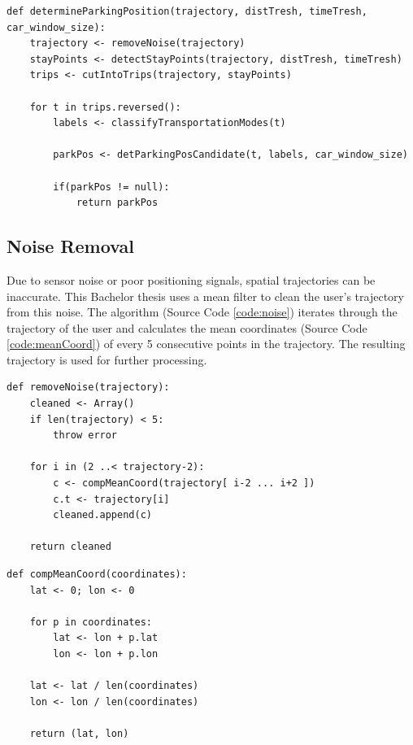 \begin{lstlisting}[style=py, caption={Pseudocode: Determine Parking Position Candidate}, label={code:DetParkPos}]
def determineParkingPosition(trajectory, distTresh, timeTresh, car_window_size):
    trajectory <- removeNoise(trajectory)
    stayPoints <- detectStayPoints(trajectory, distTresh, timeTresh)
    trips <- cutIntoTrips(trajectory, stayPoints)
    
    for t in trips.reversed():
        labels <- classifyTransportationModes(t)
        
        parkPos <- detParkingPosCandidate(t, labels, car_window_size)
        
        if(parkPos != null):
            return parkPos
\end{lstlisting}



\subsection{Noise Removal}

Due to sensor noise or poor positioning signals, spatial trajectories can be inaccurate. This Bachelor thesis uses a mean filter to clean the user's trajectory from this noise. The algorithm (Source Code \ref{code:noise}) iterates through the trajectory of the user and calculates the mean coordinates (Source Code \ref{code:meanCoord}) of every 5 consecutive points in the trajectory. The resulting trajectory is used for further processing. \cite{Zheng:2015:TDM:2764959.2743025}


\begin{lstlisting}[style=py, caption={Pseudocode: Noise Removal \cite{Zheng:2015:TDM:2764959.2743025}}, label={code:noise}]
def removeNoise(trajectory):
    cleaned <- Array()
    if len(trajectory) < 5:
        throw error
    
    for i in (2 ..< trajectory-2):
        c <- compMeanCoord(trajectory[ i-2 ... i+2 ])
        c.t <- trajectory[i]
        cleaned.append(c)
    
    return cleaned
\end{lstlisting}

\begin{lstlisting}[style=py, caption={Pseudocode: Compute Mean Coordinate \cite{Zheng:2015:TDM:2764959.2743025} }, label={code:meanCoord}]
def compMeanCoord(coordinates):
    lat <- 0; lon <- 0
    
    for p in coordinates:
        lat <- lon + p.lat
        lon <- lon + p.lon
        
    lat <- lat / len(coordinates)
    lon <- lon / len(coordinates)
    
    return (lat, lon)
\end{lstlisting}

